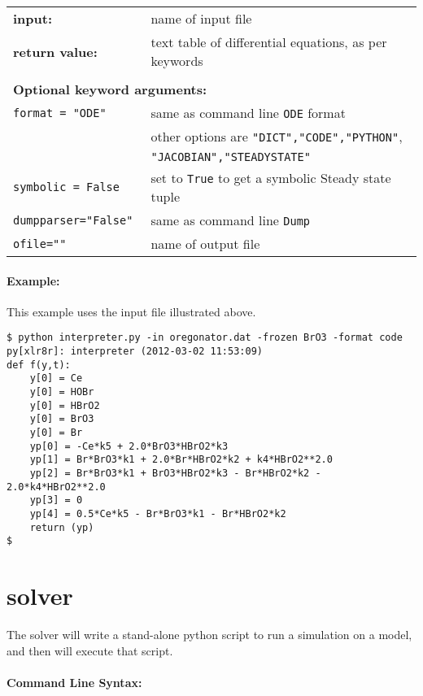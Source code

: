 \begin{tabular}{ll}
\textbf{input:} & name of input file \\
\textbf{return value:}& text table of differential equations, as per keywords \\  \\
\multicolumn{2}{l}{\textbf{Optional keyword arguments:}}\\
\tt{format = "ODE"} & same as command line {\tt ODE} format\\
& other options are {\tt "DICT","CODE","PYTHON"},\\ &{\tt "JACOBIAN","STEADYSTATE"}\\
\tt{symbolic = False} & set to {\tt True} to get a symbolic Steady state tuple\\
\tt{dumpparser="False"} &  same as command line {\tt Dump} \\
\tt{ofile=""} & name of output file
\end{tabular}



\paragraph{Example:}

This example uses the input file illustrated above.

\begin{Verbatim}[frame=single]
$ python interpreter.py -in oregonator.dat -frozen BrO3 -format code
py[xlr8r]: interpreter (2012-03-02 11:53:09)
def f(y,t):
    y[0] = Ce
    y[0] = HOBr
    y[0] = HBrO2
    y[0] = BrO3
    y[0] = Br
    yp[0] = -Ce*k5 + 2.0*BrO3*HBrO2*k3
    yp[1] = Br*BrO3*k1 + 2.0*Br*HBrO2*k2 + k4*HBrO2**2.0
    yp[2] = Br*BrO3*k1 + BrO3*HBrO2*k3 - Br*HBrO2*k2 - 2.0*k4*HBrO2**2.0
    yp[3] = 0
    yp[4] = 0.5*Ce*k5 - Br*BrO3*k1 - Br*HBrO2*k2
    return (yp)
$
\end{Verbatim}


\newpage
\section{solver}

The solver will write a stand-alone python script to run a simulation on a model, and then will execute that script. 
\paragraph{Command Line Syntax:}\ 

